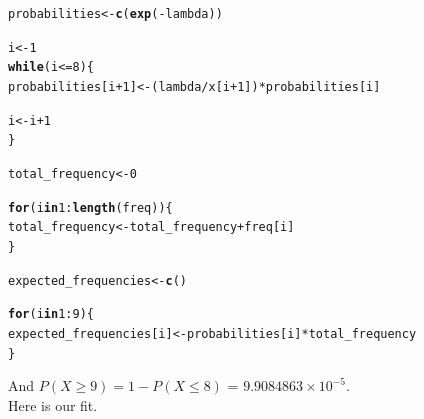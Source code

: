 \documentclass[11pt, a4paper]{article}\usepackage[]{graphicx}\usepackage[]{xcolor}
\makeatletter
\newcommand{\hlnum}[1]{\textcolor[rgb]{0.686,0.059,0.569}{#1}}%
\newcommand{\hlopt}[1]{\textcolor[rgb]{0,0,0}{#1}}%
\newcommand{\hldef}[1]{\textcolor[rgb]{0.345,0.345,0.345}{#1}}%
\newcommand{\hlkwa}[1]{\textcolor[rgb]{0.161,0.373,0.58}{\textbf{#1}}}%
\newcommand{\hlkwb}[1]{\textcolor[rgb]{0.69,0.353,0.396}{#1}}%
\newcommand{\hlkwd}[1]{\textcolor[rgb]{0.737,0.353,0.396}{\textbf{#1}}}%
\newenvironment{kframe}{%
 \def\at@end@of@kframe{}%
 \ifinner\ifhmode%
  \def\at@end@of@kframe{\end{minipage}}%
  \begin{minipage}{\columnwidth}%
 \fi\fi%
 \def\FrameCommand##1{\hskip\@totalleftmargin \hskip-\fboxsep
 \colorbox{shadecolor}{##1}\hskip-\fboxsep
     \hskip-\linewidth \hskip-\@totalleftmargin \hskip\columnwidth}%
 \MakeFramed {\advance\hsize-\width
   \@totalleftmargin\z@ \linewidth\hsize
   \@setminipage}}%
 {\par\unskip\endMakeFramed%
 \at@end@of@kframe}
\newenvironment{knitrout}{}{} %
\makeatother
\begin{document}
\begin{knitrout}\footnotesize
{}\color{fgcolor}\begin{kframe}
\begin{alltt}
\hldef{probabilities} \hlkwb{<-} \hlkwd{c}\hldef{(}\hlkwd{exp}\hldef{(}\hlopt{-}\hldef{lambda))}

\hldef{i} \hlkwb{<-} \hlnum{1}
\hlkwa{while} \hldef{(i} \hlopt{<=} \hlnum{8}\hldef{) \{}
  \hldef{probabilities[i}\hlopt{+}\hlnum{1}\hldef{]} \hlkwb{<-} \hldef{(lambda} \hlopt{/} \hldef{x[i}\hlopt{+}\hlnum{1}\hldef{])} \hlopt{*} \hldef{probabilities[i]}

  \hldef{i} \hlkwb{<-} \hldef{i} \hlopt{+} \hlnum{1}
\hldef{\}}
\end{alltt}
\end{kframe}
\end{knitrout}

\begin{knitrout}\footnotesize
{}\color{fgcolor}\begin{kframe}
\begin{alltt}
\hldef{total_frequency} \hlkwb{<-} \hlnum{0}

\hlkwa{for} \hldef{(i} \hlkwa{in} \hlnum{1}\hlopt{:}\hlkwd{length}\hldef{(freq)) \{}
  \hldef{total_frequency} \hlkwb{<-} \hldef{total_frequency} \hlopt{+} \hldef{freq[i]}
\hldef{\}}
\end{alltt}
\end{kframe}
\end{knitrout}

\begin{knitrout}\footnotesize
{}\color{fgcolor}\begin{kframe}
\begin{alltt}
\hldef{expected_frequencies} \hlkwb{<-} \hlkwd{c}\hldef{()}

\hlkwa{for} \hldef{(i} \hlkwa{in} \hlnum{1}\hlopt{:}\hlnum{9}\hldef{) \{}
  \hldef{expected_frequencies[i]} \hlkwb{<-} \hldef{probabilities[i]} \hlopt{*} \hldef{total_frequency}
\hldef{\}}
\end{alltt}
\end{kframe}
\end{knitrout}

And $P(X \geq 9) = 1 - P(X \leq 8)$ = \ensuremath{9.9084863\times 10^{-5}}. \\

Here is our fit.
\end{document}
